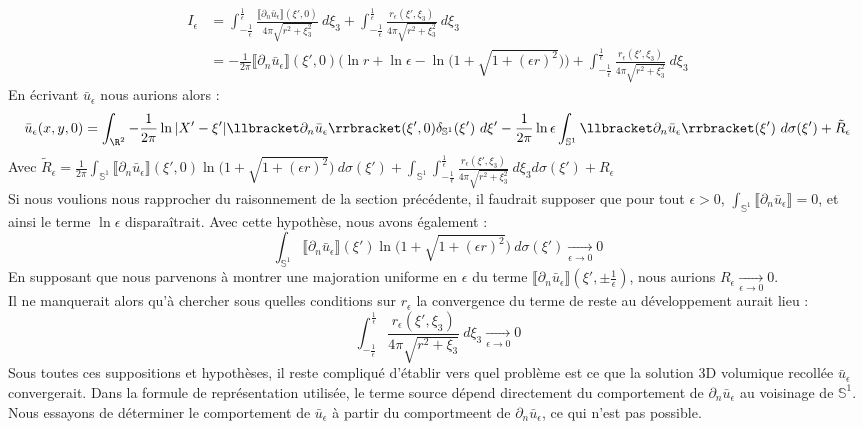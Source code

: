 \begin{align*}
    I_{\epsilon} &= \int_{-\frac{1}{\epsilon}}^{\frac{1}{\epsilon}} \frac{\llbracket \partial_n \bar{u}_{\epsilon}\rrbracket(\xi',0)}{4\pi \sqrt{r^2 + \xi_3^2}} \ d\xi_3 + \int_{-\frac{1}{\epsilon}}^{\frac{1}{\epsilon}} \frac{r_{\epsilon}(\xi',\xi_3)}{4\pi \sqrt{r^2 + \xi_3^2}} \ d\xi_3 \\
    &= - \frac{1}{2\pi} \llbracket \partial_n \bar{u}_{\epsilon}\rrbracket(\xi',0) \Big( \ln r + \ln \epsilon - \ln\big( 1 + \sqrt{1 + (\epsilon r)^2} \big) \Big) + \int_{-\frac{1}{\epsilon}}^{\frac{1}{\epsilon}} \frac{r_{\epsilon}(\xi',\xi_3)}{4\pi \sqrt{r^2 + \xi_3^2}} \ d\xi_3
\end{align*}
En écrivant $\bar{u}_{\epsilon}$ nous aurions alors :
$$ \bar{u}_{\epsilon}(x,y,0) = \int_{\R^2} -\frac{1}{2\pi}\ln |X' - \xi'|\llbracket \partial_n \bar{u}_{\epsilon} \rrbracket(\xi',0) \delta_{\mathbb{S}^1}(\xi') \ d\xi' - \frac{1}{2\pi}\ln \epsilon \int_{\mathbb{S}^1} \llbracket \partial_n \bar{u}_{\epsilon} \rrbracket(\xi') \ d\sigma(\xi') + \tilde{R}_{\epsilon}$$
Avec $\displaystyle \tilde{R}_{\epsilon} = \frac{1}{2\pi}\int_{\mathbb{S}^1} \llbracket \partial_n \bar{u}_{\epsilon} \rrbracket(\xi',0) \ln\big( 1 + \sqrt{1 + (\epsilon r)^2} \big) \ d\sigma(\xi') + \int_{\mathbb{S}^1} \int_{-\frac{1}{\epsilon}}^{\frac{1}{\epsilon}} \frac{r_{\epsilon}(\xi',\xi_3)}{4\pi \sqrt{r^2 + \xi_3^2}} \ d\xi_3 d\sigma(\xi') + R_{\epsilon}$ \\
Si nous voulions nous rapprocher du raisonnement de la section précédente, il faudrait supposer que pour tout $\epsilon > 0$, $\displaystyle \int_{\mathbb{S}^1} \llbracket \partial_n \bar{u}_{\epsilon} \rrbracket = 0 $, et ainsi le terme $\ln \epsilon$ disparaîtrait. Avec cette hypothèse, nous avons également :
$$ \int_{\mathbb{S}^1} \llbracket \partial_n \bar{u}_{\epsilon} \rrbracket(\xi') \ln\big( 1 + \sqrt{1 + (\epsilon r)^2} \big) \ d\sigma(\xi') \xrightarrow[\epsilon \to 0]{} 0 $$
En supposant que nous parvenons à montrer une majoration uniforme en $\epsilon$ du terme $\llbracket \partial_n \bar{u}_{\epsilon} \rrbracket(\xi',\pm \frac{1}{\epsilon}) $, nous aurions $R_{\epsilon} \xrightarrow[\epsilon \to 0]{} 0$. \\
Il ne manquerait alors qu'à chercher sous quelles conditions sur $r_{\epsilon}$ la convergence du terme de reste au développement aurait lieu :
$$ \int_{-\frac{1}{\epsilon}}^{\frac{1}{\epsilon}} \frac{r_{\epsilon}(\xi',\xi_3)}{4\pi \sqrt{r^2 + \xi_3}} \ d\xi_3 \xrightarrow[\epsilon \to 0]{} 0 $$
Sous toutes ces suppositions et hypothèses, il reste compliqué d'établir vers quel problème est ce que la solution 3D volumique recollée $\bar{u}_{\epsilon}$ convergerait. Dans la formule de représentation utilisée, le terme source dépend directement du comportement de $\partial_n\bar{u}_{\epsilon}$ au voisinage de $\mathbb{S}^1$. Nous essayons de déterminer le comportement de $\bar{u}_{\epsilon}$ à partir du comportmeent de $\partial_n \bar{u}_{\epsilon}$, ce qui n'est pas possible.
